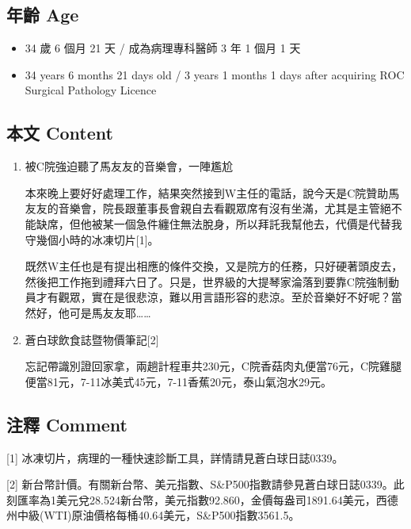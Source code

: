 \documentclass[
]{article}
\providecommand{\tightlist}{%
  \setlength{\itemsep}{0pt}\setlength{\parskip}{0pt}}
\begin{document}
\hypertarget{ux5e74ux9f61-age-67}{%
\subsection{年齡 Age}\label{ux5e74ux9f61-age-67}}

\begin{itemize}
\tightlist
\item
  34 歲 6 個月 21 天 / 成為病理專科醫師 3 年 1 個月 1 天
\item
  34 years 6 months 21 days old / 3 years 1 months 1 days after
  acquiring ROC Surgical Pathology Licence
\end{itemize}

\hypertarget{ux672cux6587-content-67}{%
\subsection{本文 Content}\label{ux672cux6587-content-67}}

\begin{enumerate}
\def\labelenumi{\arabic{enumi}.}
\item
  被C院強迫聽了馬友友的音樂會，一陣尷尬

  本來晚上要好好處理工作，結果突然接到W主任的電話，說今天是C院贊助馬友友的音樂會，院長跟董事長會親自去看觀眾席有沒有坐滿，尤其是主管絕不能缺席，但他被某一個急件纏住無法脫身，所以拜託我幫他去，代價是代替我守幾個小時的冰凍切片{[}1{]}。

  既然W主任也是有提出相應的條件交換，又是院方的任務，只好硬著頭皮去，然後把工作拖到禮拜六日了。只是，世界級的大提琴家淪落到要靠C院強制動員才有觀眾，實在是很悲涼，難以用言語形容的悲涼。至於音樂好不好呢？當然好，他可是馬友友耶\ldots\ldots{}
\item
  蒼白球飲食誌暨物價筆記{[}2{]}

  忘記帶識別證回家拿，兩趟計程車共230元，C院香菇肉丸便當76元，C院雞腿便當81元，7-11冰美式45元，7-11香蕉20元，泰山氣泡水29元。
\end{enumerate}

\hypertarget{ux6ce8ux91cb-comment-67}{%
\subsection{注釋 Comment}\label{ux6ce8ux91cb-comment-67}}

{[}1{]} 冰凍切片，病理的一種快速診斷工具，詳情請見蒼白球日誌0339。

{[}2{]}
新台幣計價。有關新台幣、美元指數、S\&P500指數請參見蒼白球日誌0339。此刻匯率為1美元兌28.524新台幣，美元指數92.860，金價每盎司1891.64美元，西德州中級(WTI)原油價格每桶40.64美元，S\&P500指數3561.5。
\end{document}
